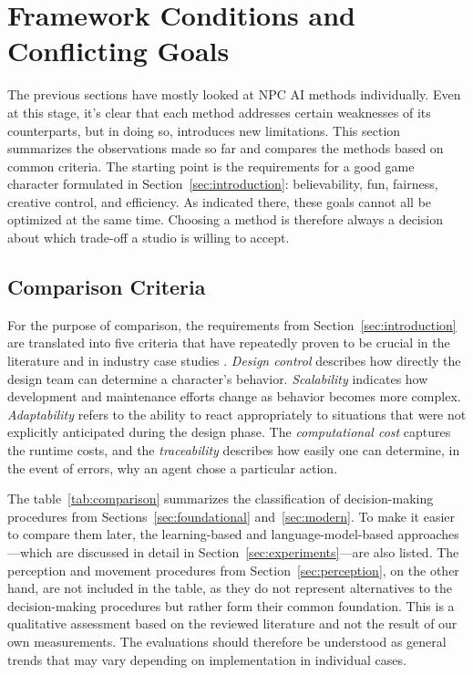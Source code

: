 \section{Framework Conditions and Conflicting Goals}
\label{sec:tradeoffs}


The previous sections have mostly looked at NPC AI methods individually. Even at this stage, it's clear that each method addresses certain weaknesses of its counterparts, but in doing so, introduces new limitations. This section summarizes the observations made so far and compares the methods based on common criteria. The starting point is the requirements for a good game character formulated in Section~\ref{sec:introduction}: believability, fun, fairness, creative control, and efficiency. As indicated there, these goals cannot all be optimized at the same time. Choosing a method is therefore always a decision about which trade-off a studio is willing to accept.


\subsection{Comparison Criteria}

For the purpose of comparison, the requirements from Section~\ref{sec:introduction} are translated into five criteria that have repeatedly proven to be crucial in the literature and in industry case studies \cite{millington2009,yannakakis2018,rabin2013}. \emph{Design control} describes how directly the design team can determine a character’s behavior. \emph{Scalability} indicates how development and maintenance efforts change as behavior becomes more complex. \emph{Adaptability} refers to the ability to react appropriately to situations that were not explicitly anticipated during the design phase. The \emph{computational cost} captures the runtime costs, and the \emph{traceability} describes how easily one can determine, in the event of errors, why an agent chose a particular action.

The table~\ref{tab:comparison} summarizes the classification of decision-making procedures from Sections~\ref{sec:foundational} and~\ref{sec:modern}. To make it easier to compare them later, the learning-based and language-model-based approaches—which are discussed in detail in Section~\ref{sec:experiments}—are also listed. The perception and movement procedures from Section~\ref{sec:perception}, on the other hand, are not included in the table, as they do not represent alternatives to the decision-making procedures but rather form their common foundation. This is a qualitative assessment based on the reviewed literature and not the result of our own measurements. The evaluations should therefore be understood as general trends that may vary depending on implementation in individual cases.


